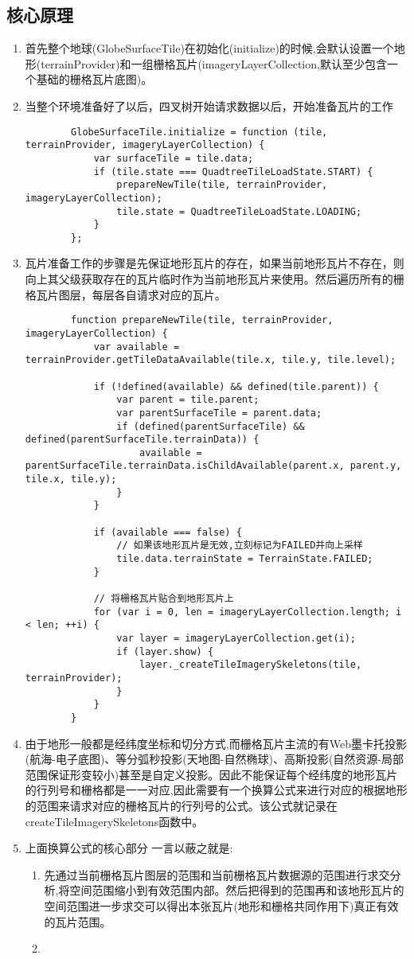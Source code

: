 \subsection{核心原理}
\begin{enumerate}
	\item 首先整个地球(GlobeSurfaceTile)在初始化(initialize)的时候,会默认设置一个地形(terrainProvider)和一组栅格瓦片(imageryLayerCollection,默认至少包含一个基础的栅格瓦片底图)。
	\item 当整个环境准备好了以后，四叉树开始请求数据以后，开始准备瓦片的工作\begin{lstlisting}
		GlobeSurfaceTile.initialize = function (tile, terrainProvider, imageryLayerCollection) {
			var surfaceTile = tile.data;
			if (tile.state === QuadtreeTileLoadState.START) {
				prepareNewTile(tile, terrainProvider, imageryLayerCollection);
				tile.state = QuadtreeTileLoadState.LOADING;
			}
		};\end{lstlisting}
	\item 瓦片准备工作的步骤是先保证地形瓦片的存在，如果当前地形瓦片不存在，则向上其父级获取存在的瓦片临时作为当前地形瓦片来使用。然后遍历所有的栅格瓦片图层，每层各自请求对应的瓦片。
		\begin{lstlisting}
		function prepareNewTile(tile, terrainProvider, imageryLayerCollection) {
			var available = terrainProvider.getTileDataAvailable(tile.x, tile.y, tile.level);
		
			if (!defined(available) && defined(tile.parent)) {
				var parent = tile.parent;
				var parentSurfaceTile = parent.data;
				if (defined(parentSurfaceTile) && defined(parentSurfaceTile.terrainData)) {
					available = parentSurfaceTile.terrainData.isChildAvailable(parent.x, parent.y, tile.x, tile.y);
				}
			}
		
			if (available === false) {
				// 如果该地形瓦片是无效,立刻标记为FAILED并向上采样
				tile.data.terrainState = TerrainState.FAILED;
			}
		
			// 将栅格瓦片贴合到地形瓦片上
			for (var i = 0, len = imageryLayerCollection.length; i < len; ++i) {
				var layer = imageryLayerCollection.get(i);
				if (layer.show) {
					layer._createTileImagerySkeletons(tile, terrainProvider);
				}
			}
		}	
		\end{lstlisting}
		\item 由于地形一般都是经纬度坐标和切分方式,而栅格瓦片主流的有Web墨卡托投影(航海-电子底图)、等分弧秒投影(天地图-自然椭球)、高斯投影(自然资源-局部范围保证形变较小)甚至是自定义投影。因此不能保证每个经纬度的地形瓦片的行列号和栅格都是一一对应,因此需要有一个换算公式来进行对应的根据地形的范围来请求对应的栅格瓦片的行列号的公式。该公式就记录在createTileImagerySkeletons函数中。
		\item 上面换算公式的核心部分 一言以蔽之就是: 
		\begin{enumerate}
			\item 先通过当前栅格瓦片图层的范围和当前栅格瓦片数据源的范围进行求交分析,将空间范围缩小到有效范围内部。然后把得到的范围再和该地形瓦片的空间范围进一步求交可以得出本张瓦片(地形和栅格共同作用下)真正有效的瓦片范围。
			\item 
		\end{enumerate}
\end{enumerate}
